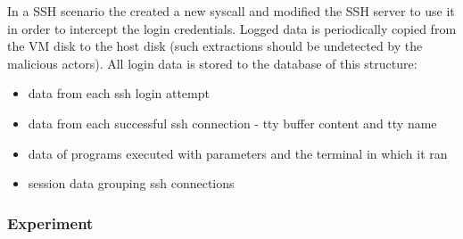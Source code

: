 In a SSH scenario the created a new syscall and modified the SSH server to use it in order to intercept the login credentials. Logged data is periodically copied from the VM disk to the host disk (such extractions should be undetected by the malicious actors). All login data is stored to the database of this structure:

\begin{itemize}[noitemsep]
	\item
	data from each ssh login attempt
	\item
	data from each successful ssh connection - tty buffer content and tty name
	\item
	data of programs executed with parameters and the terminal in which it ran
	\item
	session data grouping ssh connections
\end{itemize}

\subsubsection{Experiment \label{related:active-anal:hih-study:experiment}}

